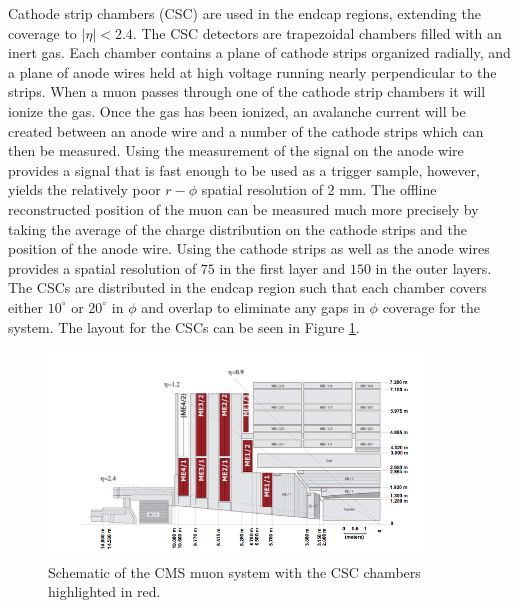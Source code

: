 Cathode strip chambers (CSC) are used in the endcap regions, extending the coverage to $|\eta| < 2.4$. 
The CSC detectors are trapezoidal chambers filled with an inert gas.
Each chamber contains a plane of cathode strips organized radially, and a plane of anode wires held at high voltage running nearly perpendicular to the strips.
When a muon passes through one of the cathode strip chambers it will ionize the gas.
Once the gas has been ionized, an avalanche current will be created between an anode wire and a number of the cathode strips which can then be measured.
Using the measurement of the signal on the anode wire provides a signal that is fast enough to be used as a trigger sample, however, yields the relatively poor $r-\phi$ spatial resolution of $2$ mm.
The offline reconstructed position of the muon can be measured much more precisely by taking the average of the charge distribution on the cathode strips and the position of the anode wire.
Using the cathode strips as well as the anode wires provides a spatial resolution of $75$ \micrometer in the first layer and $150$ \micrometer in the outer layers.
The CSCs are distributed in the endcap region such that each chamber covers either $10^{\circ}$ or $20^{\circ}$ in $\phi$ and overlap to eliminate any gaps in $\phi$ coverage for the system.
The layout for the CSCs can be seen in Figure \ref{fig:csclayout}.
\begin{figure}[htpb]
\begin{center}
\includegraphics[width=0.9\textwidth]{plots/csclayout.png}
\caption{Schematic of the CMS muon system with the CSC chambers highlighted in red\cite{CMS_DETECTOR}.}
\label{fig:csclayout}
\end{center}
\end{figure}


